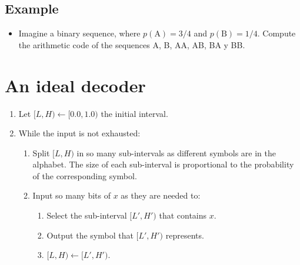 \subsection{Example}
\begin{itemize}
\tightlist
\item
  Imagine a binary sequence, where \(p(\text{A})=3/4\) and
  \(p(\text{B})=1/4\). Compute the arithmetic code of the sequences A,
  B, AA, AB, BA y BB.
\end{itemize}

\section{An ideal decoder}
\begin{enumerate}
\def\labelenumi{\arabic{enumi}.}
\tightlist
\item
  Let \([L,H)\leftarrow [0.0,1.0)\) the initial interval.
\item
  While the input is not exhausted:
  \begin{enumerate}
  \def\labelenumii{\arabic{enumii}.}
  \tightlist
  \item
    Split \([L,H)\) in so many sub-intervals as different symbols are in
    the alphabet. The size of each sub-interval is proportional to the
    probability of the corresponding symbol.
  \item
    Input so many bits of \(x\) as they are needed to:

    \begin{enumerate}
    \def\labelenumiii{\arabic{enumiii}.}
    \tightlist
    \item
      Select the sub-interval \([L',H')\) that contains \(x\).
    \item
      Output the symbol that \([L',H')\) represents.
    \item
      \([L,H)\leftarrow[L',H')\).
    \end{enumerate}
  \end{enumerate}
\end{enumerate}

